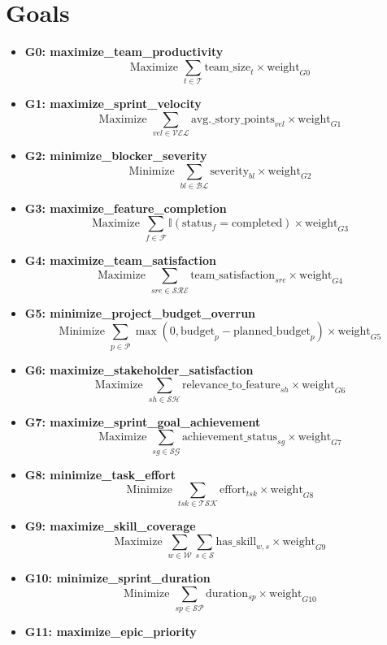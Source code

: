\documentclass{article}
\begin{document}
\section{Goals}
\begin{itemize}
    \item \textbf{G0: maximize\_team\_productivity}
    \[
    \text{Maximize } \sum_{t \in \mathcal{T}} \text{team\_size}_t \times \text{weight}_{G0}
    \]
    \item \textbf{G1: maximize\_sprint\_velocity}
    \[
    \text{Maximize } \sum_{vel \in \mathcal{VEL}} \text{avg.\_story\_points}_{vel} \times \text{weight}_{G1}
    \]
    \item \textbf{G2: minimize\_blocker\_severity}
    \[
    \text{Minimize } \sum_{bl \in \mathcal{BL}} \text{severity}_{bl} \times \text{weight}_{G2}
    \]
    \item \textbf{G3: maximize\_feature\_completion}
    \[
    \text{Maximize } \sum_{f \in \mathcal{F}} \mathbb{I}(\text{status}_f = \text{completed}) \times \text{weight}_{G3}
    \]
    \item \textbf{G4: maximize\_team\_satisfaction}
    \[
    \text{Maximize } \sum_{sre \in \mathcal{SRE}} \text{team\_satisfaction}_{sre} \times \text{weight}_{G4}
    \]
    \item \textbf{G5: minimize\_project\_budget\_overrun}
    \[
    \text{Minimize } \sum_{p \in \mathcal{P}} \max(0, \text{budget}_p - \text{planned\_budget}_p) \times \text{weight}_{G5}
    \]
    \item \textbf{G6: maximize\_stakeholder\_satisfaction}
    \[
    \text{Maximize } \sum_{sh \in \mathcal{SH}} \text{relevance\_to\_feature}_{sh} \times \text{weight}_{G6}
    \]
    \item \textbf{G7: maximize\_sprint\_goal\_achievement}
    \[
    \text{Maximize } \sum_{sg \in \mathcal{SG}} \text{achievement\_status}_{sg} \times \text{weight}_{G7}
    \]
    \item \textbf{G8: minimize\_task\_effort}
    \[
    \text{Minimize } \sum_{tsk \in \mathcal{TSK}} \text{effort}_{tsk} \times \text{weight}_{G8}
    \]
    \item \textbf{G9: maximize\_skill\_coverage}
    \[
    \text{Maximize } \sum_{w \in \mathcal{W}} \sum_{s \in \mathcal{S}} \text{has\_skill}_{w,s} \times \text{weight}_{G9}
    \]
    \item \textbf{G10: minimize\_sprint\_duration}
    \[
    \text{Minimize } \sum_{sp \in \mathcal{SP}} \text{duration}_{sp} \times \text{weight}_{G10}
    \]
    \item \textbf{G11: maximize\_epic\_priority}

\end{itemize}
\end{document}

